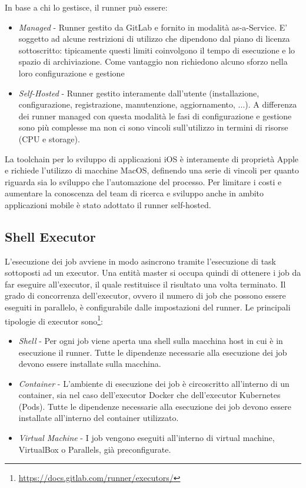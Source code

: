 In base a chi lo gestisce, il runner può essere:
\begin{itemize}
    \item \textit{Managed} - Runner gestito da GitLab e fornito in modalità as-a-Service. E' soggetto ad alcune restrizioni di utilizzo che dipendono dal piano di licenza sottoscritto: tipicamente questi limiti coinvolgono il tempo di esecuzione e lo spazio di archiviazione. Come vantaggio non richiedono alcuno sforzo nella loro configurazione e gestione
    \item \textit{Self-Hosted} - Runner gestito interamente dall'utente (installazione, configurazione, registrazione, manutenzione, aggiornamento, ...). A differenza dei runner managed con questa modalità le fasi di configurazione e gestione sono più complesse ma non ci sono vincoli sull'utilizzo in termini di risorse (CPU e storage).
\end{itemize}

La toolchain per lo sviluppo di applicazioni iOS è interamente di proprietà Apple e richiede l'utilizzo di macchine MacOS, definendo una serie di vincoli per quanto riguarda sia lo sviluppo che l'automazione del processo. Per limitare i costi e aumentare la conoscenza del team di ricerca e sviluppo anche in ambito applicazioni mobile è stato adottato il runner self-hosted.

\subsection{Shell Executor}
L'esecuzione dei job avviene in modo asincrono tramite l'esecuzione di task sottoposti ad un executor. Una entità master si occupa quindi di ottenere i job da far eseguire all'executor, il quale restituisce il risultato una volta terminato. Il grado di concorrenza dell'executor, ovvero il numero di job che possono essere eseguiti in parallelo, è configurabile dalle impostazioni del runner. Le principali tipologie di executor sono\footnote{\url{https://docs.gitlab.com/runner/executors/}}:
\begin{itemize}
    \item \textit{Shell} - Per ogni job viene aperta una shell sulla macchina host in cui è in esecuzione il runner. Tutte le dipendenze necessarie alla esecuzione dei job devono essere installate sulla macchina.
    \item \textit{Container} - L'ambiente di esecuzione dei job è circoscritto all'interno di un container, sia nel caso dell'executor Docker che dell'executor Kubernetes (Pods). Tutte le dipendenze necessarie alla esecuzione dei job devono essere installate all'interno del container utilizzato.
    \item \textit{Virtual Machine} - I job vengono eseguiti all'interno di virtual machine, VirtualBox o Parallels, già preconfigurate.
\end{itemize}

